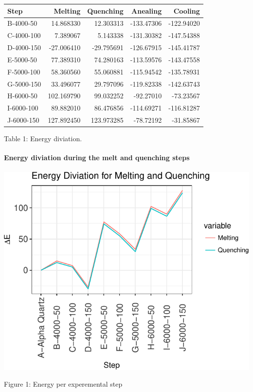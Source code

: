 \documentclass[]{article}
\let\oldparagraph\paragraph
\renewcommand{\paragraph}[1]{\oldparagraph{#1}\mbox{}}
\begin{document}
\begin{longtable}[]{@{}lrrrr@{}}
\toprule
Step & Melting & Quenching & Anealing & Cooling\tabularnewline
\midrule
\endhead
B-4000-50 & 14.868330 & 12.303313 & -133.47306 &
-122.94020\tabularnewline
C-4000-100 & 7.389067 & 5.143338 & -131.30382 &
-147.54388\tabularnewline
D-4000-150 & -27.006410 & -29.795691 & -126.67915 &
-145.41787\tabularnewline
E-5000-50 & 77.389310 & 74.280163 & -113.59576 &
-143.47558\tabularnewline
F-5000-100 & 58.360560 & 55.060881 & -115.94542 &
-135.78931\tabularnewline
G-5000-150 & 33.496077 & 29.797096 & -119.82338 &
-142.63743\tabularnewline
H-6000-50 & 102.169790 & 99.032252 & -92.27010 &
-73.23567\tabularnewline
I-6000-100 & 89.882010 & 86.476856 & -114.69271 &
-116.81287\tabularnewline
J-6000-150 & 127.892450 & 123.973285 & -78.72192 &
-31.85867\tabularnewline
\bottomrule
\end{longtable}

Table 1: Energy diviation.

\hypertarget{energy-diviation-during-the-melt-and-quenching-steps}{%
\paragraph{Energy diviation during the melt and quenching
steps}\label{energy-diviation-during-the-melt-and-quenching-steps}}

\includegraphics{Report1_files/figure-latex/Graph: Energy diviation MQ-1.pdf}

Figure 1: Energy per experemental step
\end{document}
